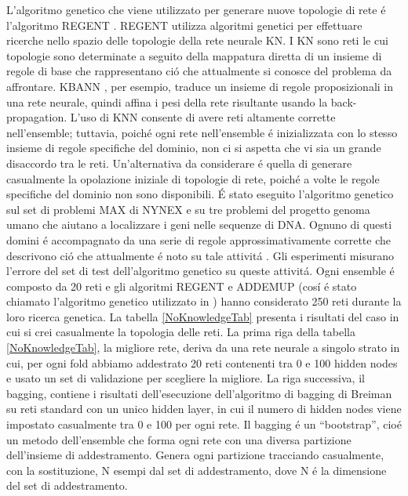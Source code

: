 \documentclass[a4paper,12pt]{report}
\begin{document}
  L'algoritmo genetico che viene utilizzato per generare nuove topologie di rete \'e l'algoritmo REGENT \cite{opitz1994using}. 
  REGENT utilizza algoritmi genetici per effettuare ricerche nello spazio delle topologie della rete neurale KN. 
  I KN sono reti le cui topologie sono determinate a seguito della mappatura diretta di un insieme di regole di base che rappresentano ci\'o che attualmente si conosce del problema da affrontare. 
  KBANN \cite{towell1994knowledge}, per esempio, traduce un insieme di regole proposizionali in una rete neurale, quindi affina i pesi della rete risultante usando la back-propagation. L'uso di KNN consente di avere reti altamente corrette nell'ensemble; tuttavia, poich\'e ogni rete nell'ensemble \'e inizializzata con lo stesso insieme di regole specifiche del dominio, non ci si aspetta che vi sia un grande disaccordo tra le reti. 
  Un'alternativa da considerare \'e quella di generare casualmente la opolazione iniziale di topologie di rete, poich\'e a volte le regole specifiche del dominio non sono disponibili.
  \'E stato eseguito l'algoritmo genetico sul set di problemi MAX di NYNEX e su tre problemi del progetto genoma umano che aiutano a localizzare i geni nelle sequenze di DNA. 
  Ognuno di questi domini \'e accompagnato da una serie di regole approssimativamente corrette che descrivono ci\'o che attualmente \'e noto su tale attivit\'a \cite{opitz1995anytime} \cite{opitz1994using}. 
  Gli esperimenti misurano l'errore del set di test dell'algoritmo genetico su queste attivit\'a. 
  Ogni ensemble \'e composto da 20 reti e gli algoritmi REGENT e ADDEMUP (cos\'i \'e stato chiamato l'algoritmo genetico utilizzato in \cite{opitz1996generating}) hanno considerato 250 reti durante la loro ricerca genetica. La tabella \ref{NoKnowledgeTab} presenta i risultati del caso in cui si crei casualmente la topologia delle reti. 
  La prima riga della tabella \ref{NoKnowledgeTab}, la migliore rete, deriva da una rete neurale a singolo strato in cui, per ogni fold abbiamo addestrato 20 reti contenenti tra 0 e 100 hidden nodes e usato un set di validazione per scegliere la migliore. 
  La riga successiva, il bagging, contiene i risultati dell'esecuzione dell'algoritmo di bagging di Breiman \cite{breiman1994bagging} su reti standard con un unico hidden layer, in cui il numero di hidden nodes viene impostato casualmente tra 0 e 100 per ogni rete. 
  Il bagging \'e un ``bootstrap'', cio\'e un metodo dell'ensemble che forma ogni rete con una diversa partizione dell'insieme di addestramento. 
  Genera ogni partizione tracciando casualmente, con la sostituzione, N esempi dal set di addestramento, dove N \'e la dimensione del set di addestramento. 
\end{document}
